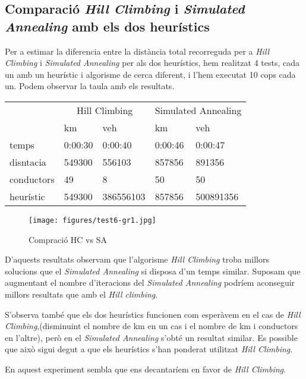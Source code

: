 \subsection{Comparació \emph{Hill Climbing} i \emph{Simulated Annealing} amb els dos heurístics}
Per a estimar la diferencia entre la distància total recorreguda per a \emph{Hill Climbing} i \emph{Simulated Annealing} per als dos heurístics,
hem realitzat 4 tests, cada un amb un heurístic i algorisme de cerca diferent, i l'hem executat 10 cops cada un.
Podem observar la taula amb els resultats.

\begin{center}
\begin{tabular}{l|llll}
 & \multicolumn{2}{c}{Hill Climbing} & \multicolumn{2}{c}{Simulated Annealing}\\
           & km       & veh       & km        & veh\\
\hline
temps      & 0:00:30  &  0:00:40  &  0:00:46  &  0:00:47\\
disntacia  & 549300   & 556103    &  857856   & 891356\\
conductors & 49       & 8         & 50        & 50\\
heurístic  & 549300   & 386556103 & 857856    & 500891356
\end{tabular}
\end{center}

\begin{figure}[H]
\begin{center}
 \texttt{[image: figures/test6-gr1.jpg]}
 \label{test6-gr1}
\caption{Compració HC vs SA}
\end{center}
\end{figure}

D'aquests resultats observam que l'algorisme \emph{Hill Climbing} troba millors solucions que el \emph{Simulated Annealing} si disposa d'un temps similar.
Suposam que augmentant el nombre d'iteracions del \emph{Simulated Annealing} podríem aconseguir millors resultats que amb el \emph{Hill climbing}.


S'observa també que els dos heurístics funcionen com esperàvem en el cas de \emph{Hill Climbing},(disminuint el nombre de km en un cas
i el nombre de km i conductors en l'altre), però en el \emph{Simulated Annealing} s'obté un resultat similar.
Es possible que això sigui degut a que els heurístics s'han ponderat utilitzat \emph{Hill Climbing}.

En aquest experiment sembla que ens decantaríem en favor de \emph{Hill Climbing}.






